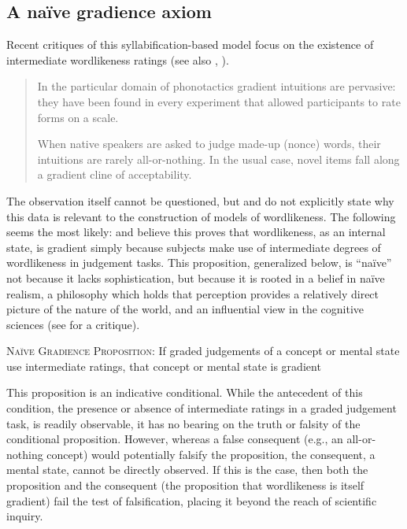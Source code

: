 \subsection{A naïve gradience axiom}

Recent critiques of this syllabification-based model focus on the existence of intermediate wordlikeness ratings (see also \citealt{Coleman1997}, \citealt{Anttila2008}). 

\begin{quote}
In the particular domain of phonotactics gradient intuitions are pervasive: they have been found in every experiment that allowed participants to rate forms on a scale.
\citep[][382]{Hayes2008a}

When native speakers are asked to judge made-up (nonce) words, their intuitions are rarely all-or-nothing. In the usual case, novel items fall along a gradient cline of acceptability. \citep[][9]{Albright2009a}
\end{quote}

The observation itself cannot be questioned, but \citeauthor{Hayes2008a} and \citeauthor{Albright2009a} do not explicitly state why this data is relevant to the construction of models of wordlikeness. The following seems the most likely: \citeauthor{Hayes2008a} and \citeauthor{Albright2009a} believe this proves that wordlikeness, as an internal state, is gradient simply because subjects make use of intermediate degrees of wordlikeness in judgement tasks. This proposition, generalized below, is ``naïve'' not because it lacks sophistication, but because it is rooted in a belief in naïve realism, a philosophy which holds that perception provides a relatively direct picture of the nature of the world, and an influential view in the cognitive sciences (see \citealt{Fodor1981a} for a critique).

\begin{unlabeledexample}
\textsc{Naïve Gradience Proposition}: If graded judgements of a concept or mental state use intermediate ratings, that concept or mental state is gradient
\end{unlabeledexample}

This proposition is an indicative conditional. While the antecedent of this condition, the presence or absence of intermediate ratings in a graded judgement task, is readily observable, it has no bearing on the truth or falsity of the conditional proposition. However, whereas a false consequent (e.g., an all-or-nothing concept) would potentially falsify the proposition, the consequent, a mental state, cannot be directly observed. If this is the case, then both the proposition and the consequent (the proposition that wordlikeness is itself gradient) fail the test of falsification, placing it beyond the reach of scientific inquiry.

